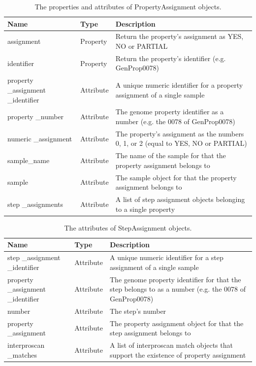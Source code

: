 \begin{table}[!ht]
\centering
\caption{The properties and attributes of PropertyAssignment objects.}
\label{tab:propertyassignmentobject}
\begin{tabular}{|p{2.7cm}|p{2cm}|p{10cm}|}
\hline
\textbf{Name} & \textbf{Type} & \textbf{Description} \\ \hline
assignment & Property & Return the property's assignment as YES, NO or PARTIAL \\ \hline
identifier & Property & Return the property's identifier (e.g. GenProp0078) \\ \hline
property \_assignment \_identifier & Attribute & A unique numeric identifier for a property assignment of a single sample \\ \hline
property \_number & Attribute & The genome property identifier as a number (e.g. the 0078 of GenProp0078) \\ \hline
numeric \_assignment & Attribute & The property's assignment as the numbers 0, 1, or 2 (equal to YES, NO or PARTIAL) \\ \hline
sample\_name & Attribute & The name of the sample for that the property assignment belongs to \\ \hline
sample & Attribute & The sample object for that the property assignment belongs to \\ \hline
step \_assignments & Attribute & A list of step assignment objects belonging to a single property \\ \hline
\end{tabular}
\end{table}

\begin{table}[!ht]
\centering
\caption{The attributes of StepAssignment objects.}
\label{tab:stepassignmentobject}
\begin{tabular}{|p{2.7cm}|p{2cm}|p{10cm}|}
\hline
\textbf{Name} & \textbf{Type} & \textbf{Description} \\ \hline
step \_assignment \_identifier & Attribute & A unique numeric identifier for a step assignment of a single sample \\ \hline
property \_assignment \_identifier & Attribute & The genome property identifier for that the step belongs to as a number (e.g. the 0078 of GenProp0078) \\ \hline
number & Attribute & The step's number \\ \hline
property \_assignment & Attribute & The property assignment object for that the step assignment belongs to \\ \hline
interproscan \_matches & Attribute & A list of interproscan match objects that support the existence of property assignment \\ \hline
\end{tabular}
\end{table}

